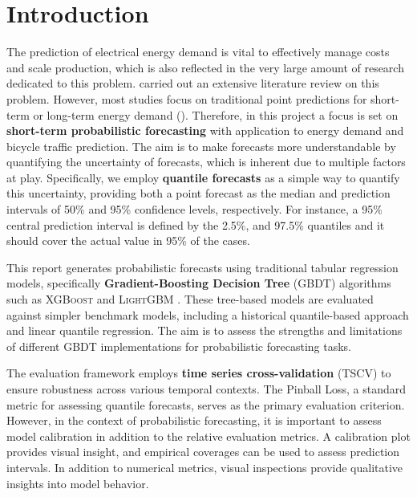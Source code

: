 \section{Introduction}
\label{ch:Introduction}

The prediction of electrical energy demand is vital to effectively manage costs and scale production, which is also reflected in the very large amount of research dedicated to this problem. \Cite{nti_electricity_2020} carried out an extensive literature review on this problem. However, most studies focus on traditional point predictions for short-term or long-term energy demand (\parencite[915]{hong_probabilistic_2016}). Therefore, in this project a focus is set on \textbf{short-term probabilistic forecasting} with application to energy demand and bicycle traffic prediction. The aim is to make forecasts more understandable by quantifying the uncertainty of forecasts, which is inherent due to multiple factors at play. Specifically, we employ \textbf{quantile forecasts} as a simple way to quantify this uncertainty, providing both a point forecast as the median and prediction intervals of 50\% and 95\% confidence levels, respectively. For instance, a 95\% central prediction interval is defined by the 2.5\%, and 97.5\% quantiles and it should cover the actual value in 95\% of the cases.

This report generates probabilistic forecasts using traditional tabular regression models, specifically \textbf{Gradient-Boosting Decision Tree} (GBDT) algorithms such as \textsc{XGBoost} \parencite{chen_xgboost_2016} and \textsc{LightGBM} \parencite{ke_lightgbm_2017}. These tree-based models are evaluated against simpler benchmark models, including a historical quantile-based approach and linear quantile regression. The aim is to assess the strengths and limitations of different GBDT implementations for probabilistic forecasting tasks.

The evaluation framework employs \textbf{time series cross-validation} (TSCV) to ensure robustness across various temporal contexts. The Pinball Loss, a standard metric for assessing quantile forecasts, serves as the primary evaluation criterion. However, in the context of probabilistic forecasting, it is important to assess model calibration in addition to the relative evaluation metrics. A calibration plot provides visual insight, and empirical coverages can be used to assess prediction intervals.
In addition to numerical metrics, visual inspections provide qualitative insights into model behavior.


